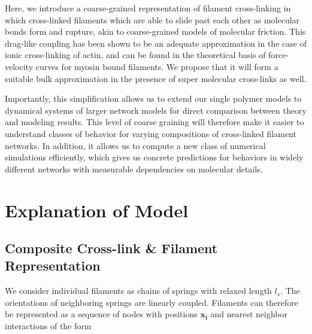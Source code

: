 \documentclass[pre,preprint]{revtex4-1}
\begin{document}
Here, we introduce a coarse-grained representation of filament cross-linking in which cross-linked filaments which are able to slide past each other as molecular bonds form and rupture, akin to coarse-grained models of molecular friction\cite{theo_friction,theo_frictionSam,theo_molefric}.  This drag-like coupling has been shown to be an adequate approximation in the case of ionic cross-linking of actin\cite{mol_fric,theo_hydroish2}, and can be found in the theoretical basis of force-velocity curves for myosin bound filaments\cite{theo_frictionShila}. We propose that it will form a suitable bulk approximation in the presence of super molecular cross-links as well.

Importantly, this simplification allows us to extend our single polymer models to dynamical systems of larger network models for direct comparison between theory and modeling results.  This level of coarse graining will therefore make it easier to understand classes of behavior for varying compositions of cross-linked filament networks.  In addition, it allows us to compute a new class of numerical simulations efficiently, which gives us concrete predictions for behaviors in widely different networks with measurable dependencies on molecular details.



































\section{Explanation of Model}

\subsection{Composite Cross-link \& Filament Representation}
We consider individual filaments as chains of springs with relaxed length $l_s$.  The orientations of neighboring springs are linearly coupled. Filaments can therefore be represented as a sequence of nodes with positions $\mathbf{x_i}$ and nearest neighbor interactions of the form
\end{document}
